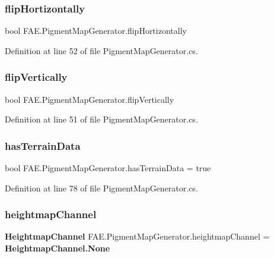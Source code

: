 \subsubsection{flip\+Hortizontally}
{\footnotesize\ttfamily bool F\+A\+E.\+Pigment\+Map\+Generator.\+flip\+Hortizontally}



Definition at line 52 of file Pigment\+Map\+Generator.\+cs.

\mbox{\label{class_f_a_e_1_1_pigment_map_generator_a04ca969709d41c61ad19d106abd10912}} 
\subsubsection{flip\+Vertically}
{\footnotesize\ttfamily bool F\+A\+E.\+Pigment\+Map\+Generator.\+flip\+Vertically}



Definition at line 51 of file Pigment\+Map\+Generator.\+cs.

\mbox{\label{class_f_a_e_1_1_pigment_map_generator_a555dc9fc2f0bbf2805306a09fd1fe61c}} 
\subsubsection{has\+Terrain\+Data}
{\footnotesize\ttfamily bool F\+A\+E.\+Pigment\+Map\+Generator.\+has\+Terrain\+Data = true}



Definition at line 78 of file Pigment\+Map\+Generator.\+cs.

\mbox{\label{class_f_a_e_1_1_pigment_map_generator_a4008c911aef8430499930123cf603c09}} 
\subsubsection{heightmap\+Channel}
{\footnotesize\ttfamily \textbf{ Heightmap\+Channel} F\+A\+E.\+Pigment\+Map\+Generator.\+heightmap\+Channel = \textbf{ Heightmap\+Channel.\+None}}



